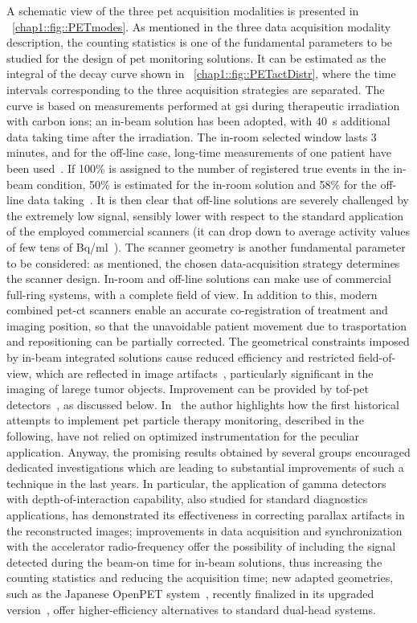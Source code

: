 A schematic view of the three \gls{pet} acquisition modalities is presented in \figurename~\ref{chap1::fig::PETmodes}. As mentioned in the three data acquisition modality description, the counting statistics is one of the fundamental parameters to be studied for the design of \gls{pet} monitoring solutions. It can be estimated as the integral of the decay curve shown in \figurename~\ref{chap1::fig::PETactDistr}, where the time intervals corresponding to the three acquisition strategies are separated. The curve is based on measurements performed at \gls{gsi} during therapeutic irradiation with carbon ions; an in-beam solution has been adopted, with 40~s additional data taking time after the irradiation. The in-room selected window lasts 3 minutes, and for the off-line case, long-time measurements of one patient have been used~\parencite{Fiedler2008b}. If 100\% is assigned to the number of registered true events in the in-beam condition, 50\% is estimated for the in-room solution and 58\% for the off-line data taking~\parencite{Shakirin2011}. It is then clear that off-line solutions are severely challenged by the extremely low signal, sensibly lower with respect to the standard application of the employed commercial scanners (it can drop down to average activity values of few tens of Bq/ml~\parencite{Bauer2013}).
The scanner geometry is another fundamental parameter to be considered: as mentioned, the chosen data-acquisition strategy determines the scanner design. In-room and off-line solutions can make use of commercial full-ring systems, with a complete field of view. In addition to this, modern combined \gls{pet}-\gls{ct} scanners enable an accurate co-registration of treatment and imaging position, so that the unavoidable patient movement due to trasportation and repositioning can be partially corrected. The geometrical constraints imposed by in-beam integrated solutions cause reduced efficiency and restricted field-of-view, which are reflected in image artifacts~\parencite{Crespo2006}, particularly significant in the imaging of larege tumor objects. Improvement can be provided by \gls{tof}-\gls{pet} detectors~\parencite{Crespo2007, Surti2011}, as discussed below.
In~\cite{Parodi2015} the author highlights how the first historical attempts to implement \gls{pet} particle therapy monitoring, described in the following, have not relied on optimized instrumentation for the peculiar application. Anyway, the promising results obtained by several groups encouraged dedicated investigations which are leading to substantial improvements of such a technique in the last years. In particular, the application of gamma detectors with depth-of-interaction capability, also studied for standard diagnostics applications, has demonstrated its effectiveness in correcting parallax artifacts in the reconstructed images; improvements in data acquisition and synchronization with the accelerator radio-frequency offer the possibility of including the signal detected during the beam-on time for in-beam solutions, thus increasing the counting statistics and reducing the acquisition time; new adapted geometries, such as the Japanese OpenPET system~\parencite{Tashima2012, Yamaya2008}, recently finalized in its upgraded version~\parencite{Yamaya2017}, offer higher-efficiency alternatives to standard dual-head systems. 

